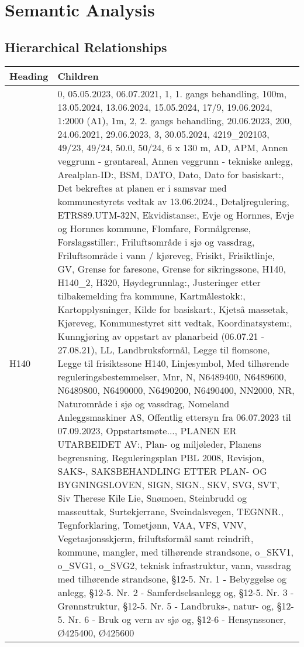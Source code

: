 \section{Semantic Analysis}

\subsection{Hierarchical Relationships}

\begin{table}[h]
\centering
\begin{tabular}{l|l}
\hline
Heading & Children \\
\hline
H140 & 0, 05.05.2023, 06.07.2021, 1, 1. gangs behandling, 100m, 13.05.2024, 13.06.2024, 15.05.2024, 17/9, 19.06.2024, 1:2000 (A1), 1m, 2, 2. gangs behandling, 20.06.2023, 200, 24.06.2021, 29.06.2023, 3, 30.05.2024, 4219_202103, 49/23, 49/24, 50.0, 50/24, 6 x 130 m, AD, APM, Annen veggrunn - grøntareal, Annen veggrunn - tekniske anlegg, Arealplan-ID:, BSM, DATO, Dato, Dato for basiskart:, Det bekreftes at planen er i samsvar med kommunestyrets vedtak av 13.06.2024., Detaljregulering, ETRS89.UTM-32N, Ekvidistanse:, Evje og Hornnes, Evje og Hornnes kommune, Flomfare, Formålgrense, Forslagsstiller:, Friluftsområde i sjø og vassdrag, Friluftsområde i vann / kjøreveg, Frisikt, Frisiktlinje, GV, Grense for faresone, Grense for sikringssone, H140, H140_2, H320, Høydegrunnlag:, Justeringer etter  tilbakemelding fra kommune, Kartmålestokk:, Kartopplysninger, Kilde for basiskart:, Kjetså massetak, Kjøreveg, Kommunestyret sitt vedtak, Koordinatsystem:, Kunngjøring av oppstart av planarbeid (06.07.21 - 27.08.21), LL, Landbruksformål, Legge til flomsone, Legge til frisiktssone H140, Linjesymbol, Med tilhørende reguleringsbestemmelser, Mnr, N, N6489400, N6489600, N6489800, N6490000, N6490200, N6490400, NN2000, NR, Naturområde i sjø og vassdrag, Nomeland Anleggsmaskiner AS, Offentlig ettersyn fra 06.07.2023 til 07.09.2023, Oppstartsmøte..., PLANEN ER UTARBEIDET AV:, Plan- og miljøleder, Planens begrensning, Reguleringsplan PBL 2008, Revisjon, SAKS-, SAKSBEHANDLING ETTER PLAN- OG BYGNINGSLOVEN, SIGN, SIGN., SKV, SVG, SVT, Siv Therese Kile Lie, Snømoen, Steinbrudd og masseuttak, Surtekjerrane, Sveindalsvegen, TEGNNR., Tegnforklaring, Tometjønn, VAA, VFS, VNV, Vegetasjonsskjerm, friluftsformål samt reindrift, kommune, mangler, med tilhørende strandsone, o_SKV1, o_SVG1, o_SVG2, teknisk infrastruktur, vann, vassdrag med tilhørende strandsone, §12-5. Nr. 1 - Bebyggelse og anlegg, §12-5. Nr. 2 - Samferdselsanlegg og, §12-5. Nr. 3 - Grønnstruktur, §12-5. Nr. 5 - Landbruks-, natur- og, §12-5. Nr. 6 - Bruk og vern av sjø og, §12-6 - Hensynssoner, Ø425400, Ø425600 \\

\end{tabular}
\end{table}
